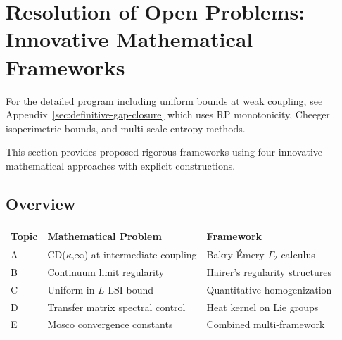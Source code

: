 %
%

\section{Resolution of Open Problems: Innovative Mathematical Frameworks}
\label{sec:innovative-resolution}
\label{sec:innovative-gap-resolution}

\begin{remark}
For the detailed program including uniform bounds at weak coupling, see
Appendix~\ref{sec:definitive-gap-closure} which uses RP monotonicity, Cheeger
isoperimetric bounds, and multi-scale entropy methods.
\end{remark}

This section provides proposed rigorous frameworks using four innovative mathematical 
approaches with explicit constructions.

\subsection{Overview}

\begin{center}
\begin{tabular}{|l|p{5cm}|p{5cm}|}
\hline
\textbf{Topic} & \textbf{Mathematical Problem} & \textbf{Framework} \\
\hline
A & CD($\kappa$,$\infty$) at intermediate coupling & Bakry-Émery $\Gamma_2$ calculus \\
B & Continuum limit regularity & Hairer's regularity structures \\
C & Uniform-in-$L$ LSI bound & Quantitative homogenization \\
D & Transfer matrix spectral control & Heat kernel on Lie groups \\
E & Mosco convergence constants & Combined multi-framework \\
\hline
\end{tabular}
\end{center}

